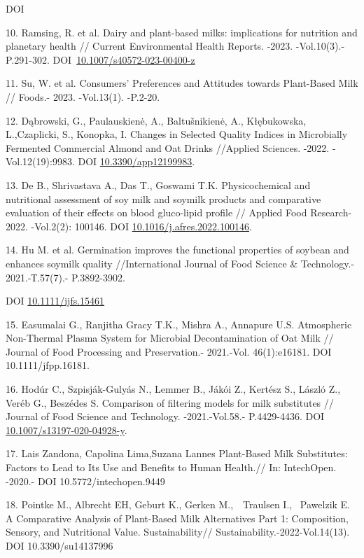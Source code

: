 \begin{references}
DOI
\href{http://dx.doi.org/10.1080/87559129.2021.1952421}{}

10. Ramsing, R. et al. Dairy and plant-based milks: implications for
nutrition and planetary health // Current Environmental Health Reports.
-2023. -Vol.10(3).-P.291-302.
DOI~\href{https://doi.org/10.1007/s40572-023-00400-z}{10.1007/s40572-023-00400-z}

11. Su, W. et al. Consumers' Preferences and Attitudes towards
Plant-Based Milk // Foods.- 2023. -Vol.13(1). -P.2-20.
\href{https://doi.org/10.3390/foods13010002}{}

12. Dąbrowski, G., Paulauskienė, A., Baltušnikienė, A., Kłębukowska,
L.,Czaplicki, S., Konopka, I. Changes in Selected Quality Indices in
Microbially Fermented Commercial Almond and Oat Drinks //Applied
Sciences. -2022. -Vol.12(19):9983. DOI
\href{https://doi.org/10.3390/app12199983}{10.3390/app12199983}.

13. De B., Shrivastava A., Das T., Goswami T.K. Physicochemical and
nutritional assessment of soy milk and soymilk products and comparative
evaluation of their effects on blood gluco-lipid profile // Applied Food
Research-2022. -Vol.2(2): 100146. DOI
\href{https://doi.org/10.1016/j.crfs.2022.100146}{10.1016/j.afres.2022.100146}.

14. Hu M. et al. Germination improves the functional properties of
soybean and enhances soymilk quality //International Journal of Food
Science \& Technology.- 2021.-Т.57(7).- P.3892-3902.

DOI \href{http://dx.doi.org/10.1111/ijfs.15461}{10.1111/ijfs.15461}

15. Easumalai G., Ranjitha Gracy T.K., Mishra A., Annapure U.S.
Atmospheric Non-Thermal Plasma System for Microbial Decontamination of
Oat Milk // Journal of Food Processing and Preservation.- 2021.-Vol.
46(1):e16181. DOI 10.1111/jfpp.16181.

16. Hodúr C., Szpisják-Gulyás N., Lemmer B., Jákói Z., Kertész S., László
Z., Veréb G., Beszédes S. Comparison of filtering models for milk
substitutes // Journal of Food Science and Technology. -2021.-Vol.58.-
P.4429-4436. DOI
\href{https://doi.org/10.1007/s13197-020-04928-y}{10.1007/s13197-020-04928-y}.

17. Lais Zandona, Capolina Lima,Suzana Lannes Plant-Based Milk
Substitutes: Factors to Lead to Its Use and Benefits to Human Health.//
In: IntechOpen. -2020.- DOI 10.5772/intechopen.9449

18. Pointke M., Albrecht EH, Geburt K., Gerken M.,~~Traulsen I.,~
Pawelzik E. A Comparative Analysis of Plant-Based Milk Alternatives Part
1: Composition, Sensory, and Nutritional Value. Sustainability//
Sustainability.-2022-Vol.14(13). DOI 10.3390/su14137996~
\end{references}

